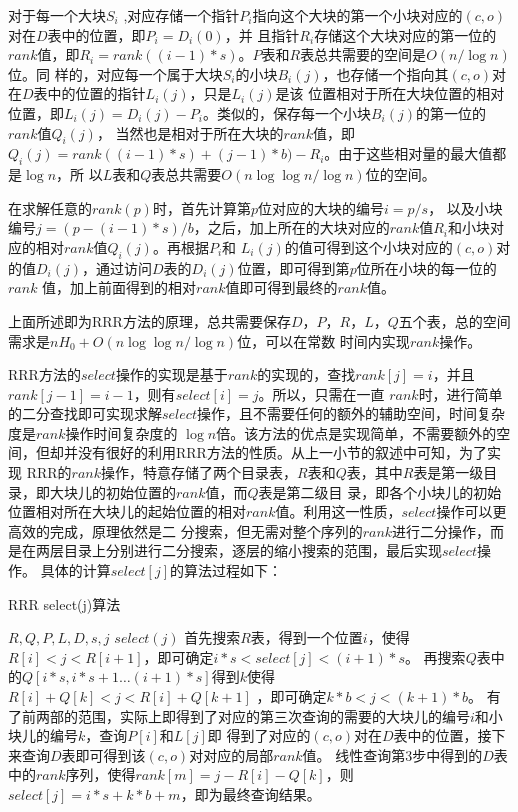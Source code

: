 对于每一个大块$S_i$ ,对应存储一个指针$P_i$指向这个大块的第一个小块对应的$(c, o)$对在$D$表中的位置，即$P_i = D_i(0)$，并
且指针$R_i$存储这个大块对应的第一位的$rank$值，即$R_i = rank((i-1)*s)$。$P$表和$R$表总共需要的空间是$O(n/\log n)$位。同
样的，对应每一个属于大块$S_i$的小块$B_i(j)$，也存储一个指向其$(c, o)$对在$D$表中的位置的指针$L_i(j)$，只是$L_i(j)$是该
位置相对于所在大块位置的相对位置，即$L_i(j) = D_i(j)-P_i$。类似的，保存每一个小块$B_i(j)$的第一位的$rank$值$Q_i(j)$，
当然也是相对于所在大块的$rank$值，即$Q_i(j) = rank((i-1)*s) + (j-1)*b) - R_i$。由于这些相对量的最大值都是$\log n$，所
以$L$表和$Q$表总共需要$O(n \log\log n/\log n)$位的空间。

在求解任意的$rank(p)$时，首先计算第$p$位对应的大块的编号$i = p/s$，
以及小块编号$j = (p -(i -1)*s)/b$，之后，加上所在的大块对应的$rank$值$R_i$和小块对应的相对$rank$值$Q_i(j)$。再根据$P_i$和
$L_i(j)$的值可得到这个小块对应的$(c, o)$对的值$D_i(j)$，通过访问$D$表的$D_i(j)$位置，即可得到第$p$位所在小块的每一位的$rank$
值，加上前面得到的相对$rank$值即可得到最终的$rank$值。

上面所述即为RRR方法的原理，总共需要保存$D，P，R，L，Q$五个表，总的空间需求是$nH_0 + O(n \log\log n/\log n)$位，可以在常数
时间内实现$rank$操作\cite{makinen2007implicit}。

RRR方法的$select$操作的实现是基于$rank$的实现的，查找$rank[j]=i$，并且$rank[j-1]=i-1$，则有$select[i]=j$。所以，只需在一直
$rank$时，进行简单的二分查找即可实现求解$select$操作，且不需要任何的额外的辅助空间，时间复杂度是$rank$操作时间复杂度的
$\log n$倍。该方法的优点是实现简单，不需要额外的空间，但却并没有很好的利用RRR方法的性质。从上一小节的叙述中可知，为了实现
RRR的$rank$操作，特意存储了两个目录表，$R$表和$Q$表，其中$R$表是第一级目录，即大块儿的初始位置的$rank$值，而$Q$表是第二级目
录，即各个小块儿的初始位置相对所在大块儿的起始位置的相对$rank$值。利用这一性质，$select$操作可以更高效的完成，原理依然是二
分搜索，但无需对整个序列的$rank$进行二分操作，而是在两层目录上分别进行二分搜索，逐层的缩小搜索的范围，最后实现$select$操作。
具体的计算$select[j]$的算法过程如下：
\begin{algorithm}
    \caption{RRR select(j)算法}
    \label{alg:rrrselect}
    \begin{algorithmic}[1]
        \Require $R,Q,P,L,D,s,j$
        \Ensure $select(j)$
        \State 首先搜索$R$表，得到一个位置$i$，使得$R[i]<j<R[i+1]$，即可确定$i*s<select[j]<(i+1)*s$。
        \State 再搜索$Q$表中的$Q[i*s,i*s+1\ldots (i+1)*s]$得到$k$使得$R[i]+Q[k]<j<R[i]+Q[k+1]$ ，即可确定$k*b<j<(k+1)*b$。
        \State 有了前两部的范围，实际上即得到了对应的第三次查询的需要的大块儿的编号$i$和小块儿的编号$k$，查询$P[i]$和$L[j]$即
               得到了对应的$(c,o)$对在$D$表中的位置，接下来查询$D$表即可得到该$(c,o)$对对应的局部$rank$值。 
        \State 线性查询第3步中得到的$D$表中的$rank$序列，使得$rank[m]=j-R[i]-Q[k]$，则$select[j]=i*s+k*b+m$，即为最终查询结果。
    \end{algorithmic}
\end{algorithm}

